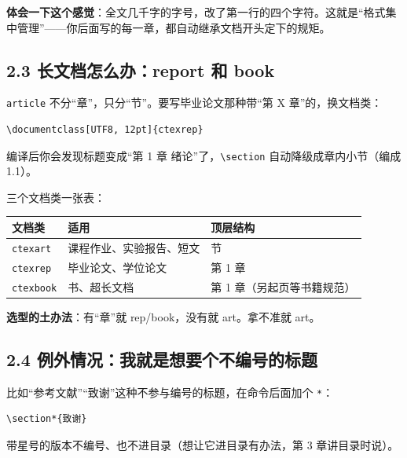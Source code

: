 \textbf{体会一下这个感觉}：全文几千字的字号，改了第一行的四个字符。这就是“格式集中管理”——你后面写的每一章，都自动继承文档开头定下的规矩。

\subsection*{2.3 长文档怎么办：report 和 book}

\texttt{article} 不分“章”，只分“节”。要写毕业论文那种带“第 X 章”的，换文档类：

\begin{lstlisting}
\documentclass[UTF8, 12pt]{ctexrep}
\end{lstlisting}

编译后你会发现标题变成“第 1 章 绪论”了，\texttt{\textbackslash{}section} 自动降级成章内小节（编成 1.1）。

三个文档类一张表：

\begin{table}[htbp]
\centering
\small
\begin{tabularx}{\linewidth}{@{}*{3}{>{\raggedright\arraybackslash}X}@{}}
\toprule
\textbf{文档类} & \textbf{适用} & \textbf{顶层结构} \\
\midrule
\texttt{ctexart} & 课程作业、实验报告、短文 & 1 节 \\
\texttt{ctexrep} & 毕业论文、学位论文 & 第 1 章 \\
\texttt{ctexbook} & 书、超长文档 & 第 1 章（另起页等书籍规范） \\
\bottomrule
\end{tabularx}
\end{table}

\textbf{选型的土办法}：有“章”就 rep/book，没有就 art。拿不准就 art。

\subsection*{2.4 例外情况：我就是想要个不编号的标题}

比如“参考文献”“致谢”这种不参与编号的标题，在命令后面加个 \texttt{*}：

\begin{lstlisting}
\section*{致谢}
\end{lstlisting}

带星号的版本不编号、也不进目录（想让它进目录有办法，第 3 章讲目录时说）。

